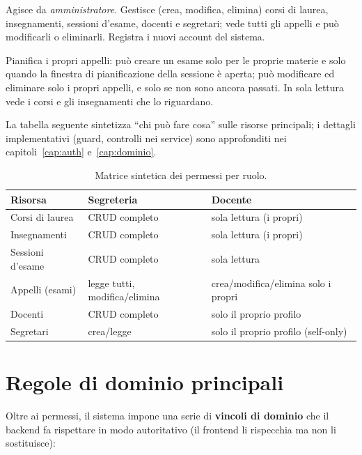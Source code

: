 \documentclass[11pt,a4paper,oneside]{report}
\begin{document}
\begin{description}[leftmargin=1.6em,style=nextline]
  \item[\textsc{Segreteria}] Agisce da \emph{amministratore}. Gestisce (crea,
        modifica, elimina) corsi di laurea, insegnamenti, sessioni d'esame,
        docenti e segretari; vede tutti gli appelli e può modificarli o
        eliminarli. Registra i nuovi account del sistema.
  \item[\textsc{Docente}] Pianifica i propri appelli: può creare un esame solo
        per le proprie materie e solo quando la finestra di pianificazione della
        sessione è aperta; può modificare ed eliminare solo i propri appelli, e
        solo se non sono ancora passati. In sola lettura vede i corsi e gli
        insegnamenti che lo riguardano.
\end{description}

La tabella seguente sintetizza ``chi può fare cosa'' sulle risorse principali;
i dettagli implementativi (guard, controlli nei service) sono approfonditi nei
capitoli~\ref{cap:auth} e~\ref{cap:dominio}.

\begin{table}[h]
\centering
\renewcommand{\arraystretch}{1.25}
\begin{tabularx}{\linewidth}{@{}lXX@{}}
\toprule
\textbf{Risorsa} & \textbf{Segreteria} & \textbf{Docente} \\
\midrule
Corsi di laurea     & CRUD completo            & sola lettura (i propri) \\
Insegnamenti        & CRUD completo            & sola lettura (i propri) \\
Sessioni d'esame    & CRUD completo            & sola lettura \\
Appelli (esami)     & legge tutti, modifica/elimina & crea/modifica/elimina solo i propri \\
Docenti             & CRUD completo            & solo il proprio profilo \\
Segretari           & crea/legge               & solo il proprio profilo (self-only) \\
\bottomrule
\end{tabularx}
\caption{Matrice sintetica dei permessi per ruolo.}
\end{table}

\section{Regole di dominio principali}
Oltre ai permessi, il sistema impone una serie di \textbf{vincoli di dominio}
che il backend fa rispettare in modo autoritativo (il frontend li rispecchia ma
non li sostituisce):
\end{document}
